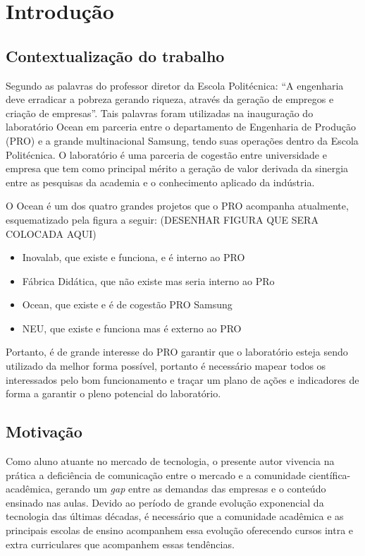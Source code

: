 \chapter[Introdução]{Introdução}
\label{chap:introducao}
\section{Contextualização do trabalho}
\label{cha:contexto}


Segundo as palavras do professor diretor da Escola Politécnica: “A engenharia deve erradicar a pobreza gerando riqueza, através da geração de empregos e criação de empresas”. Tais palavras foram utilizadas na inauguração do laboratório Ocean em parceria entre o departamento de Engenharia de Produção (PRO) e a grande multinacional Samsung, tendo suas operações dentro da Escola Politécnica. O laboratório é uma parceria de cogestão entre universidade e empresa que tem como principal mérito a geração de valor derivada da sinergia entre as pesquisas da academia e o conhecimento aplicado da indústria. 

O Ocean é um dos quatro grandes projetos que o PRO acompanha atualmente, esquematizado pela figura a seguir: (DESENHAR FIGURA QUE SERA COLOCADA AQUI)

\begin{itemize}
\item Inovalab, que existe e funciona, e é interno ao PRO
\item Fábrica Didática, que não existe mas seria interno ao PRo
\item Ocean, que existe e é de cogestão PRO Samsung
\item NEU, que existe e funciona mas é externo ao PRO
\end{itemize}

Portanto, é de grande interesse do PRO garantir que o laboratório esteja sendo utilizado da melhor forma possível, portanto é necessário mapear todos os interessados pelo bom funcionamento e traçar um plano de ações e indicadores de forma a garantir o pleno potencial do laboratório.

\section{Motivação} %
\label{cha:motivacao}

Como aluno atuante no mercado de tecnologia, o presente autor vivencia na prática a deficiência de comunicação entre o mercado e a comunidade científica-acadêmica, gerando um \textit{gap} entre as demandas das empresas e o conteúdo ensinado nas aulas. Devido ao período de grande evolução exponencial da tecnologia das últimas décadas, é necessário que a comunidade acadêmica e as principais escolas de ensino acompanhem essa evolução oferecendo cursos intra e extra curriculares que acompanhem essas tendências.

